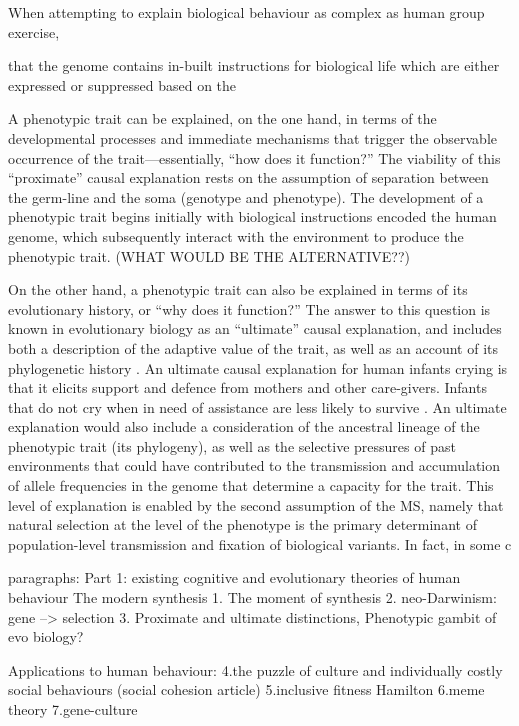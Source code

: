 When attempting to explain biological behaviour as complex as human group exercise,

 that the genome contains in-built instructions for biological life which are either expressed or suppressed based on the

A phenotypic trait can be explained, on the one hand, in terms of the developmental processes and immediate mechanisms that trigger the observable occurrence of the trait---essentially, ``how does it function?'' \citep{Mayr1961,Tinbergen1963}  The viability of this ``proximate'' causal explanation rests on the assumption of separation between the germ-line and the soma (genotype and phenotype). The development of a phenotypic trait begins initially with biological instructions encoded the human genome, which subsequently interact with the environment to produce the phenotypic trait.   (WHAT WOULD BE THE ALTERNATIVE??)

On the other hand, a phenotypic trait can also be explained in terms of its evolutionary history, or ``why does it function?''  The answer to this question is known in evolutionary biology as an ``ultimate'' causal explanation, and includes both a description of the adaptive value of the trait, as well as an account of its phylogenetic history \citep{Mayr1961,Tinbergen1963}. An ultimate causal explanation for human infants crying is that it elicits support and defence from mothers and other care-givers.  Infants that do not cry when in need of assistance are less likely to survive \citep[38]{Scott-Phillips2011}. An ultimate explanation would also include a consideration of the ancestral lineage of the phenotypic trait (its phylogeny), as well as the selective pressures of past environments that could have contributed to the transmission and accumulation of allele frequencies in the genome that determine a capacity for the trait.  This level of explanation is enabled by the second assumption of the MS, namely that natural selection at the level of the phenotype is the primary determinant of population-level transmission and fixation of biological variants.  In fact, in some c




paragraphs:
Part 1: existing cognitive and evolutionary theories of human behaviour
The modern synthesis
    1. The moment of synthesis
    2. neo-Darwinism: gene --> selection
    3. Proximate and ultimate distinctions, Phenotypic gambit of evo biology?


Applications to human behaviour:
    4.the puzzle of culture and individually costly social behaviours (social cohesion article)
    5.inclusive fitness Hamilton
    6.meme theory
    7.gene-culture

